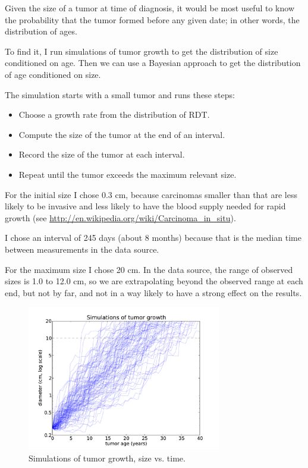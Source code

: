 \documentclass[12pt]{book}
\begin{document}
Given the size of a tumor at time of diagnosis, it would be most
useful to know the probability that the tumor formed before
any given date; in other words, the distribution of ages.

To find it, I run simulations of tumor growth to get the
distribution of size conditioned on age.  Then we can use
a Bayesian approach to get the
distribution of age conditioned on size.

The simulation starts with a small tumor and runs these steps:

\begin{itemize}

\item Choose a growth rate from the distribution of RDT.

\item Compute the size of the tumor at the end of an interval.

\item Record the size of the tumor at each interval.

\item Repeat until the tumor exceeds the maximum relevant size.

\end{itemize}

For the initial size I chose 0.3 cm, because carcinomas smaller than
that are less likely to be invasive and less likely to have the blood
supply needed for rapid growth (see
\url{http://en.wikipedia.org/wiki/Carcinoma_in_situ}).  

I chose an interval of 245 days (about 8 months) because that is the
median time between measurements in the data source.

For the maximum size I chose 20 cm.  In the data source, the range of
observed sizes is 1.0 to 12.0 cm, so we are extrapolating beyond
the observed range at each end, but not by far, and not in a way
likely to have a strong effect on the results.

\begin{figure}
\centerline{\includegraphics[height=2.5in]{figs/kidney4.pdf}}
\caption{Simulations of tumor growth, size vs. time.}
\label{fig.kidney4}
\end{figure}
\end{document}

